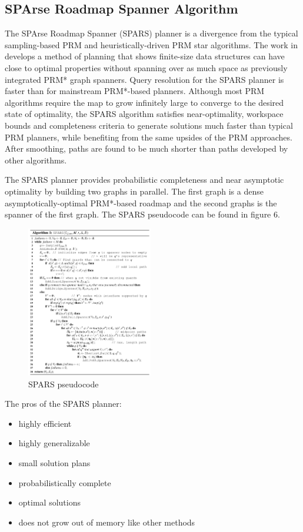 \documentclass[conference]{IEEEtran} \usepackage[T1]{fontenc} \usepackage[backend=biber, style=ieee]{biblatex}
\begin{document}
\subsection{SPArse Roadmap Spanner Algorithm} \label{SPARS}
The SPArse Roadmap Spanner (SPARS) planner is a divergence from the typical sampling-based PRM and heuristically-driven PRM star algorithms. The work in \cite{spars} develops a 
method of planning that shows finite-size data structures can have close to optimal properties without spanning over as much space as previously integrated PRM* graph spanners. 
Query resolution for the SPARS planner is faster than for mainstream PRM*-based planners. Although most PRM algorithms require the map to grow infinitely large to converge to 
the desired state of optimality, the SPARS algorithm satisfies near-optimality, workspace bounds and completeness criteria to generate solutions much faster than typical
PRM planners, while benefiting from the same upsides of the PRM approaches. After smoothing, paths are found to be much shorter than paths developed by other algorithms.

The SPARS planner provides probabilistic completeness and near asymptotic optimality by building two graphs in parallel. The first graph is a dense asymptotically-optimal
PRM*-based roadmap and the second graphs is the spanner of the first graph. The SPARS pseudocode can be found in figure 6.

\begin{figure}
\label{figure6} 
\centering 
\includegraphics[width=0.49\textwidth]{spars}
\caption{SPARS pseudocode}
\end{figure}

The pros of the SPARS planner:
\begin{itemize}
 \item highly efficient
 \item highly generalizable
 \item small solution plans
 \item probabilistically complete
 \item optimal solutions
 \item does not grow out of memory like other methods
\end{itemize}
\end{document}
